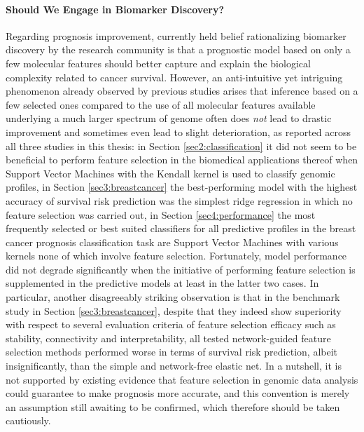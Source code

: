 \paragraph{Should We Engage in Biomarker Discovery?} Regarding prognosis improvement, currently held belief rationalizing biomarker discovery by the research community is that a prognostic model based on only a few molecular features should better capture and explain the biological complexity related to cancer survival. However, an anti-intuitive yet intriguing phenomenon already observed by previous studies \cite{Haury2011influence} arises that inference based on a few selected ones compared to the use of all molecular features available underlying a much larger spectrum of genome often does \emph{not} lead to drastic improvement and sometimes even lead to slight deterioration, as reported across all three studies in this thesis: in Section \ref{sec2:classification} it did not seem to be beneficial to perform feature selection in the biomedical applications thereof when Support Vector Machines with the Kendall kernel is used to classify genomic profiles, in Section \ref{sec3:breastcancer} the best-performing model with the highest accuracy of survival risk prediction was the simplest ridge regression in which no feature selection was carried out, in Section \ref{sec4:performance} the most frequently selected or best suited classifiers for all predictive profiles in the breast cancer prognosis classification task are Support Vector Machines with various kernels none of which involve feature selection. Fortunately, model performance did not degrade significantly when the initiative of performing feature selection is supplemented in the predictive models at least in the latter two cases. In particular, another disagreeably striking observation is that in the benchmark study in Section \ref{sec3:breastcancer}, despite that they indeed show superiority with respect to several evaluation criteria of feature selection efficacy such as stability, connectivity and interpretability, all tested network-guided feature selection methods performed worse in terms of survival risk prediction, albeit insignificantly, than the simple and network-free elastic net. In a nutshell, it is not supported by existing evidence that feature selection in genomic data analysis could guarantee to make prognosis more accurate, and this convention is merely an assumption still awaiting to be confirmed, which therefore should be taken cautiously.


